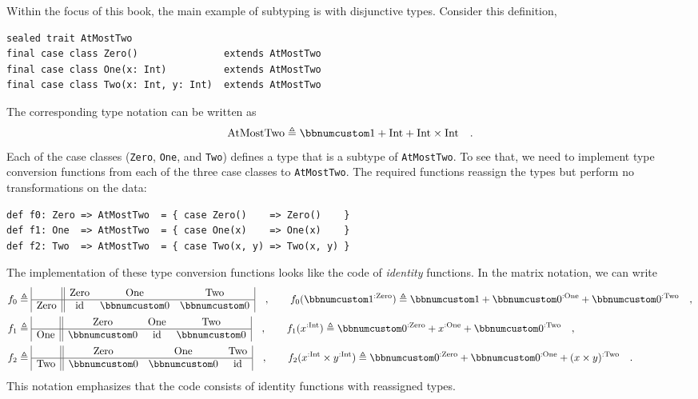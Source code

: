 Within the focus of this book, the main example of subtyping is with
disjunctive types. Consider this definition,
\begin{lstlisting}
sealed trait AtMostTwo
final case class Zero()               extends AtMostTwo
final case class One(x: Int)          extends AtMostTwo
final case class Two(x: Int, y: Int)  extends AtMostTwo
\end{lstlisting}
The corresponding type notation can be written as
\[
\text{AtMostTwo}\triangleq\bbnum 1+\text{Int}+\text{Int}\times\text{Int}\quad.
\]
Each of the case classes (\lstinline!Zero!, \lstinline!One!, and
\lstinline!Two!) defines a type that is a subtype of \lstinline!AtMostTwo!.
To see that, we need to implement type conversion functions from each
of the three case classes to \lstinline!AtMostTwo!. The required
functions reassign the types but perform no transformations on the
data:
\begin{lstlisting}
def f0: Zero => AtMostTwo  = { case Zero()    => Zero()    }
def f1: One  => AtMostTwo  = { case One(x)    => One(x)    }
def f2: Two  => AtMostTwo  = { case Two(x, y) => Two(x, y) }
\end{lstlisting}
The implementation of these type conversion functions looks like the
code of \emph{identity} functions. In the matrix notation, we can
write
\begin{align*}
f_{0} & \triangleq\begin{array}{|c||ccc|}
 & \text{Zero} & \text{One} & \text{Two}\\
\hline \text{Zero} & \text{id} & \bbnum 0 & \bbnum 0
\end{array}\quad,\quad\quad f_{0}(\bbnum 1^{:\text{Zero}})\triangleq\bbnum 1+\bbnum 0^{:\text{One}}+\bbnum 0^{:\text{Two}}\quad,\\
f_{1} & \triangleq\begin{array}{|c||ccc|}
 & \text{Zero} & \text{One} & \text{Two}\\
\hline \text{One} & \bbnum 0 & \text{id} & \bbnum 0
\end{array}\quad,\quad\quad f_{1}(x^{:\text{Int}})\triangleq\bbnum 0^{:\text{Zero}}+x^{:\text{One}}+\bbnum 0^{:\text{Two}}\quad,\\
f_{2} & \triangleq\begin{array}{|c||ccc|}
 & \text{Zero} & \text{One} & \text{Two}\\
\hline \text{Two} & \bbnum 0 & \bbnum 0 & \text{id}
\end{array}\quad,\quad\quad f_{2}(x^{:\text{Int}}\times y^{:\text{Int}})\triangleq\bbnum 0^{:\text{Zero}}+\bbnum 0^{:\text{One}}+(x\times y)^{:\text{Two}}\quad.
\end{align*}
This notation emphasizes that the code consists of identity functions
with reassigned types.

